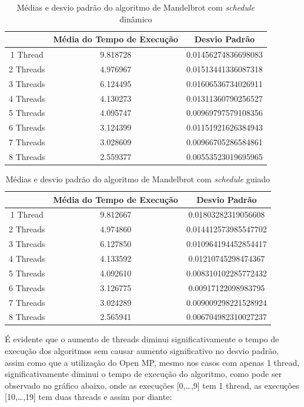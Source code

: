 \documentclass[10pt,a4paper]{article}
\begin{document}
		\begin{table}[htb]
			\begin{tabular}{|c|c|c|}
				\hline
				& Média do Tempo de Execução & Desvio Padrão \\ \hline
				1 Thread  & 9.818728 & 0.01456274836698083 \\ \hline
				2 Threads & 4.976967 & 0.01513441336087318 \\ \hline
				3 Threads & 6.124495 & 0.01606536734026911 \\ \hline
				4 Threads & 4.130273 & 0.01311360790256527 \\ \hline
				5 Threads & 4.095747 & 0.00969797579108356 \\ \hline
				6 Threads & 3.124399 & 0.01151921626384943 \\ \hline
				7 Threads & 3.028609 & 0.00966705286584861 \\ \hline
				8 Threads & 2.559377 & 0.00553523019695965 \\ \hline
			\end{tabular}
			\caption{Médias e desvio padrão do algoritmo de Mandelbrot com \textit{schedule} dinâmico}
		\end{table}

		\begin{table}[htb]
			\begin{tabular}{|c|c|c|}
				\hline
				& Média do Tempo de Execução & Desvio Padrão \\ \hline
				1 Thread  & 9.812667 & 0.01803282319056608 \\ \hline
				2 Threads & 4.974860 & 0.014412573985547702 \\ \hline
				3 Threads & 6.127850 & 0.010964194452854417 \\ \hline
				4 Threads & 4.133592 & 0.01210745298474367 \\ \hline
				5 Threads & 4.092610 & 0.008310102285772432 \\ \hline
				6 Threads & 3.126775 & 0.00917122098983795 \\ \hline
				7 Threads & 3.024289 & 0.009009298221528924 \\ \hline
				8 Threads & 2.565941 & 0.006704982310027237 \\ \hline
			\end{tabular}
			\caption{Médias e desvio padrão do algoritmo de Mandelbrot com \textit{schedule} guiado}
		\end{table}
		
		É evidente que o aumento de threads diminui significativamente o tempo de execução dos algoritmos sem causar 
		aumento significativo no desvio padrão, assim como que a utilização do Open MP, mesmo nos casos com apenas 1 thread, significativamente diminui o tempo
		de execução do algoritmo, como pode ser observado no gráfico abaixo, onde as execuções [0,\ldots,9] tem 1 thread, as execuções [10,\ldots,19] tem duas threads
		e assim por diante:
		
\end{document}

